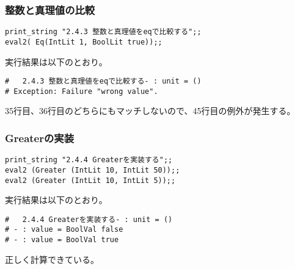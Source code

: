 \documentclass[a4paper,9pt]{jarticle}
\begin{document}
\subsubsection{整数と真理値の比較}
\begin{lstlisting}
print_string "2.4.3 整数と真理値をeqで比較する";;
eval2( Eq(IntLit 1, BoolLit true));;
\end{lstlisting}
実行結果は以下のとおり。
\begin{lstlisting}
#   2.4.3 整数と真理値をeqで比較する- : unit = ()
# Exception: Failure "wrong value".
\end{lstlisting}
35行目、36行目のどちらにもマッチしないので、45行目の例外が発生する。

\newpage

\subsubsection{Greaterの実装}

\begin{lstlisting}
print_string "2.4.4 Greaterを実装する";;
eval2 (Greater (IntLit 10, IntLit 50));;
eval2 (Greater (IntLit 10, IntLit 5));;
\end{lstlisting}
実行結果は以下のとおり。
\begin{lstlisting}
#   2.4.4 Greaterを実装する- : unit = ()
# - : value = BoolVal false
# - : value = BoolVal true
\end{lstlisting}
正しく計算できている。
\end{document}
